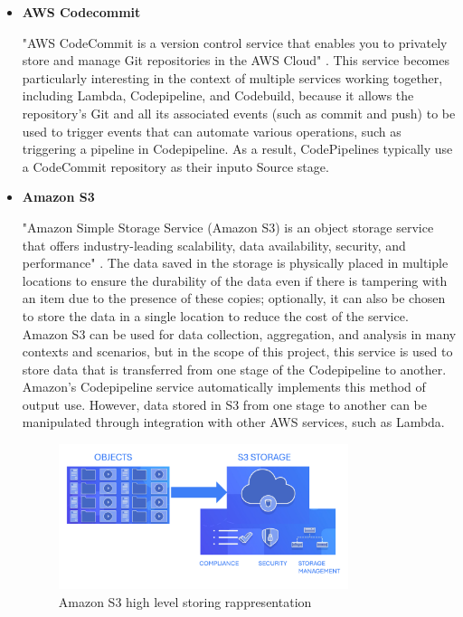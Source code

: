 \begin{itemize}
    \item \textbf{AWS Codecommit}
    
    "AWS CodeCommit is a version control service that enables you to privately store and manage Git repositories in the AWS Cloud" \cite{AWSCodecommit}. This service becomes particularly interesting in the context of multiple services working together, including Lambda, Codepipeline, and Codebuild, because it allows the repository's Git and all its associated events (such as commit and push) to be used to trigger events that can automate various operations, such as triggering a pipeline in Codepipeline. As a result, CodePipelines typically use a CodeCommit repository as their inputo Source stage.
    
    \item \textbf{Amazon S3}
    
    "Amazon Simple Storage Service (Amazon S3) is an object storage service that offers industry-leading scalability, data availability, security, and performance" \cite{AWSamazonS3}. The data saved in the storage is physically placed in multiple locations to ensure the durability of the data even if there is tampering with an item due to the presence of these copies; optionally, it can also be chosen to store the data in a single location to reduce the cost of the service. Amazon S3 can be used for data collection, aggregation, and analysis in many contexts and scenarios, but in the scope of this project, this service is used to store data that is transferred from one stage of the Codepipeline to another. Amazon's Codepipeline service automatically implements this method of output use. However, data stored in S3 from one stage to another can be manipulated through integration with other AWS services, such as Lambda.
    \begin{figure}[h]  %
        \centering
        \includegraphics[width=0.8\textwidth]{images/AWSS3.png}  %
        \caption{Amazon S3 high level storing rappresentation}
        \label{fig:AWSS3}
    \end{figure}
    

\end{itemize}

